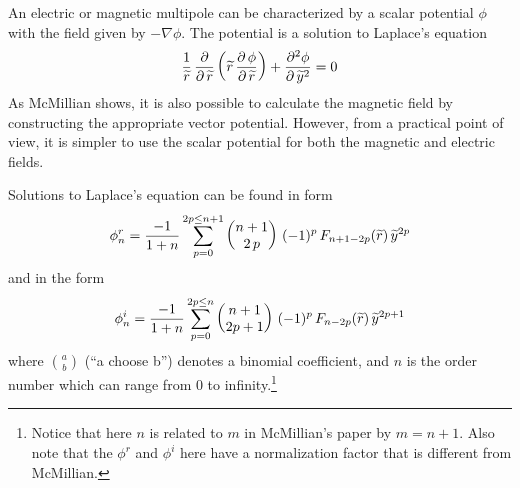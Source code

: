 An electric or magnetic multipole can be characterized by a scalar potential $\phi$ with
the field given by $-\nabla \phi$.  The potential is a solution to Laplace's equation
\begin{equation}
  \frac{1}{{\widetilde r}} \, \frac{\partial}{\partial \, {\widetilde r}} 
  \left( {\widetilde r} \, \frac{\partial \, \phi}{\partial \, {\widetilde r}} \right) +
  \frac{\partial^2 \phi}{\partial \, {\widetilde y}^2} = 0
\end{equation}
As McMillian shows, it is also possible to calculate the magnetic field by constructing the
appropriate vector potential. However, from a practical point of view, it is simpler to use the
scalar potential for both the magnetic and electric fields.

Solutions to Laplace's equation can be found in form
\begin{equation}
  \phi_{n}^r = \frac{-1}{1+n} \sum_{p = 0}^{2p \le n+1} 
             \begin{pmatrix} n + 1 \cr 2 \, p \end{pmatrix} \,
             (-1)^{p} \, F_{n+1-2p}({\widetilde r}) \, {\widetilde y}^{2p}
  \label{pspn1}
\end{equation}
and in the form
\begin{equation}
  \phi_{n}^i = \frac{-1}{1+n} \sum_{p = 0}^{2p \le n}
             \begin{pmatrix} n + 1 \cr 2p +1 \end{pmatrix} \,
             (-1)^{p} \, F_{n-2p}({\widetilde r}) \, {\widetilde y}^{2p+1}
  \label{pspn2}
\end{equation}
where $\binom{a}{b}$ (``a choose b'') denotes a binomial coefficient, and $n$ is the order
number which can range from 0 to infinity.\footnote
  { 
Notice that here $n$ is related to $m$ in
McMillian's paper by $m = n + 1$. Also note that the $\phi^r$ and $\phi^i$ here have a
normalization factor that is different from McMillian.
  }

